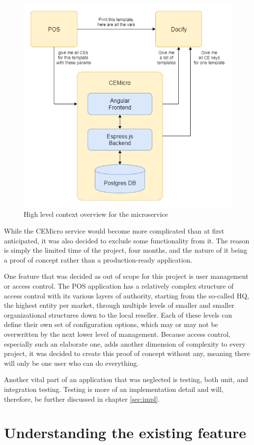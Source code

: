 \begin{figure}
  \centering
  \includegraphics[width=0.6\linewidth]{assets/high-level-overview.png}
  \caption{High level context overview for the microservice}
  \label{fig:context}
\end{figure}

While the CEMicro service would become more complicated than at first anticipated, it was also decided to exclude some functionality from it. The reason is simply the limited time of the project, four months, and the nature of it being a proof of concept rather than a production-ready application.

One feature that was decided as out of scope for this project is user management or access control. The POS application has a relatively complex structure of access control with its various layers of authority, starting from the so-called HQ, the highest entity per market, through multiple levels of smaller and smaller organizational structures down to the local reseller. Each of these levels can define their own set of configuration options, which may or may not be overwritten by the next lower level of management. Because access control, especially such an elaborate one, adds another dimension of complexity to every project, it was decided to create this proof of concept without any, meaning there will only be one user who can do everything.

Another vital part of an application that was neglected is testing, both unit, and integration testing. Testing is more of an implementation detail and will, therefore, be further discussed in chapter \ref{sec:impl}.


\section{Understanding the existing feature}
\label{sec:arch:understanding}


